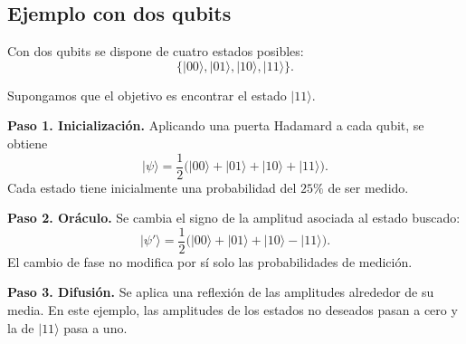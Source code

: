 \documentclass[11pt,a4paper]{article}
\begin{document}
\begin{center}
\end{center}

\subsection{Ejemplo con dos qubits}

Con dos qubits se dispone de cuatro estados posibles:
\[
\bigl\{\lvert 00\rangle,\lvert 01\rangle,\lvert 10\rangle,\lvert 11\rangle\bigr\}.
\]

Supongamos que el objetivo es encontrar el estado $\lvert 11\rangle$.

\textbf{Paso 1. Inicialización.} Aplicando una puerta Hadamard a cada qubit, se obtiene
\[
\lvert\psi\rangle=\frac12\bigl(\lvert 00\rangle+\lvert 01\rangle+\lvert 10\rangle+\lvert 11\rangle\bigr).
\]
Cada estado tiene inicialmente una probabilidad del $25\%$ de ser medido.

\textbf{Paso 2. Oráculo.} Se cambia el signo de la amplitud asociada al estado buscado:
\[
\lvert\psi'\rangle=\frac12\bigl(\lvert 00\rangle+\lvert 01\rangle+\lvert 10\rangle-\lvert 11\rangle\bigr).
\]
El cambio de fase no modifica por sí solo las probabilidades de medición.

\textbf{Paso 3. Difusión.} Se aplica una reflexión de las amplitudes alrededor de su media. En este ejemplo, las amplitudes de los estados no deseados pasan a cero y la de $\lvert 11\rangle$ pasa a uno.
\end{document}
